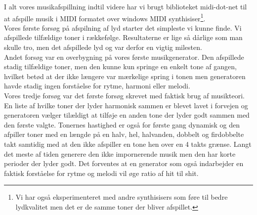 I alt vores musikafspillning indtil videre har vi brugt biblioteket midi-dot-net\cite{midi-dot-net} til at afspille musik i MIDI formatet over windows MIDI synthisiser\footnote{Vi har også eksperimenteret med andre synthisisers som føre til bedre lydkvalitet men det er de samme toner der bliver afspillet.}.\\
Vores første forsøg på afspilning af lyd starter det simpleste vi kunne finde. Vi afspillede tilfældige toner i rækkefølge. Resultaterne er lige så dårlige som man skulle tro, men det afspillede lyd og var derfor en vigtig milesten.\\
Andet forsøg var en overbygning på vores første musikgenerator. Den afspillede stadig tilfældige toner, men den kunne kun springe en enkelt tone af gangen, hvilket betød at der ikke længere var mærkelige spring i tonen men generatoren havde stadig ingen forståelse for rytme, harmoni eller melodi.\\
Vores tredje forsøg var det første forsøg skrevet med faktisk brug af musikteori. En liste af hvilke toner der lyder harmonisk sammen er blevet lavet i forvejen og generatoren vælger tilældigt at tilføje en anden tone der lyder godt sammen med den første valgte. Tonernes hastighed er også for første gang dynamisk og den afpiller toner med en længde på en halv, hel, halvanden, dobbelt og firdobbelte takt samtidig med at den ikke afspiller en tone hen over en 4 takts grænse.\newline{}
Langt det meste af tiden generere den ikke impornerende musik men den har korte perioder der lyder godt. Det forventes at en generator som også indarbejder en faktisk forståelse for rytme og melodi vil øge ratio af hit til shit.